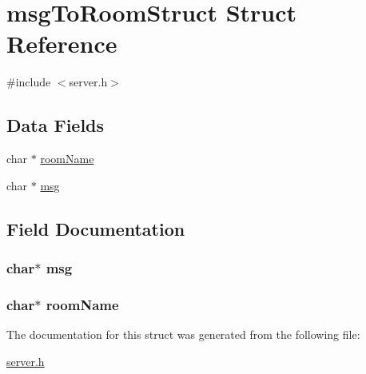 \hypertarget{structmsg_to_room_struct}{\section{msg\+To\+Room\+Struct Struct Reference}
\label{structmsg_to_room_struct}
}


{\ttfamily \#include $<$server.\+h$>$}

\subsection*{Data Fields}
\begin{DoxyCompactItemize}
\item 
char $\ast$ \hyperlink{structmsg_to_room_struct_a1d5a0818ccdf00289deede0a05375f14}{room\+Name}
\item 
char $\ast$ \hyperlink{structmsg_to_room_struct_a32d2f5216cddb59c7cc8fb2806a7e727}{msg}
\end{DoxyCompactItemize}


\subsection{Field Documentation}
\hypertarget{structmsg_to_room_struct_a32d2f5216cddb59c7cc8fb2806a7e727}{
\subsubsection[{msg}]{\setlength{\rightskip}{0pt plus 5cm}char$\ast$ msg}}\label{structmsg_to_room_struct_a32d2f5216cddb59c7cc8fb2806a7e727}
\hypertarget{structmsg_to_room_struct_a1d5a0818ccdf00289deede0a05375f14}{
\subsubsection[{room\+Name}]{\setlength{\rightskip}{0pt plus 5cm}char$\ast$ room\+Name}}\label{structmsg_to_room_struct_a1d5a0818ccdf00289deede0a05375f14}


The documentation for this struct was generated from the following file\+:\begin{DoxyCompactItemize}
\item 
\hyperlink{server_8h}{server.\+h}\end{DoxyCompactItemize}
